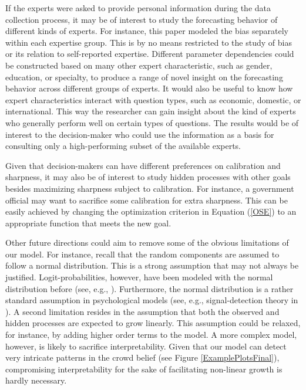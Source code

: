 \documentclass[aoas, preprint]{imsart}
\numberwithin{equation}{section}
\theoremstyle{plain}
\begin{document}
If the experts were asked to provide personal information during the data collection process, it may be of interest to study the forecasting behavior of different kinds of experts. For instance, this paper modeled the bias separately within each expertise group. This is by no means restricted to the study of bias or its relation to self-reported expertise. Different parameter dependencies could be constructed based on many other expert characteristic, such as gender, education, or specialty, to produce a range of novel insight on the forecasting behavior across different groups of experts. It would also be useful to know how expert characteristics interact with question types, such as economic, domestic, or international. This way the researcher can gain insight about the kind of experts who generally perform well on certain types of questions. The results would be of interest to the decision-maker who could use the information as a basis for consulting only a high-performing subset of the available experts. 
 
 
Given that decision-makers can have different preferences on calibration and sharpness, it may also be of interest to study hidden processes with other goals besides maximizing sharpness subject to calibration. For instance, a government official may want to sacrifice some calibration for extra sharpness. This can be easily achieved by changing the optimization criterion in Equation (\ref{OSE}) to an appropriate function that meets the new goal. 
 
Other future directions could aim to remove some of the obvious limitations of our model. For instance, recall that the random components are assumed to follow a normal distribution. This is a strong assumption that may not always be justified. Logit-probabilities, however, have been modeled with the normal distribution before (see, e.g., \citet{Erev1994}). Furthermore, the normal distribution is a rather standard assumption in psychological models (see, e.g.,  signal-detection theory  in \citet{tanner1954decision}). A second limitation resides in the assumption that both the observed and hidden processes are expected to grow linearly. This assumption could be relaxed, for instance, by adding higher order terms to the model. A more complex model, however, is likely to sacrifice interpretability. Given that our model can detect very intricate patterns in the crowd belief  (see Figure \ref{ExamplePlotsFinal}), compromising interpretability for the sake of facilitating non-linear growth is hardly necessary. 
\end{document}
